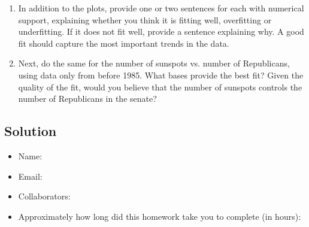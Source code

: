 \documentclass[submit]{harvardml}
\begin{document}
\begin{problem}
\begin{enumerate}
\item In addition to the plots, provide one or two sentences for each with
numerical support, explaining whether you think it is fitting well,
overfitting or underfitting.  If it does not fit well, provide a
sentence explaining why. A good fit should capture the most important
trends in the data.

\item Next, do the same for the number of sunspots vs. number of
Republicans, using data only from before 1985.  What bases provide the
best fit?  Given the quality of the fit, would you believe that the
number of sunspots controls the number of Republicans in the senate?

\end{enumerate}

\end{problem}

\subsection*{Solution}


\newpage
\begin{problem}[Administrative]
\leavevmode
\begin{itemize}
    \item Name:
    \item Email:
    \item Collaborators:
    \item Approximately how long did this homework take you to complete (in hours):   
\end{itemize}
\end{problem}
\end{document}
